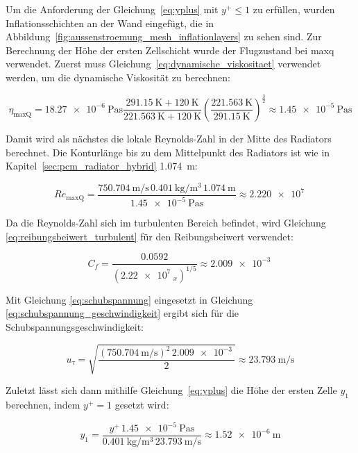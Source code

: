 Um die Anforderung der Gleichung~\ref{eq:yplus} mit $y^+ \leq 1$ zu erfüllen, wurden Inflationsschichten an der Wand eingefügt, die in Abbildung~\ref{fig:aussenstroemung_mesh_inflationlayers}
zu sehen sind. Zur Berechnung der Höhe der ersten Zellschicht wurde der Flugzustand bei \ac{maxq} verwendet.
Zuerst muss Gleichung~\ref{eq:dynamische_viskositaet} verwendet werden, um die dynamische Viskosität zu berechnen:

\begin{equation*}
  \eta_\mathrm{max Q} = \SI{18,27e-6}{\pascal\second} \frac{\SI{291,15}{\kelvin} + \SI{120}{\kelvin}}{\SI{221,563}{\kelvin} + \SI{120}{\kelvin}} {\left( \frac{\SI{221,563}{\kelvin}}{\SI{291,15}{\kelvin}} \right)}^{\frac{3}{2}} \approx \SI{1,45e-5}{\pascal\second}
\end{equation*}

Damit wird als nächstes die lokale Reynolds-Zahl in der Mitte des Radiators berechnet. Die Konturlänge bis zu dem Mittelpunkt des Radiators ist wie in Kapitel~\ref{sec:pcm_radiator_hybrid} \SI{1,074}{\meter}:

\begin{equation*}
  Re_{\mathrm{maxQ}} = \frac{\SI{750,704}{\meter\per\second}\,\SI{0,401}{\kilogram\per\meter\cubed}\,\SI{1,074}{\meter}}{\SI{1,45e-5}{\pascal\second}} \approx \SI{2,220e7}{}
\end{equation*}

Da die Reynolds-Zahl sich im turbulenten Bereich befindet, wird Gleichung \ref{eq:reibungsbeiwert_turbulent} für den Reibungsbeiwert verwendet:

\begin{equation*}
  C_f = \frac{0.0592}{\left({\SI{2,22e7}{}}_x\right)^{1/5}} \approx \SI{2,009e-3}{}
\end{equation*}

Mit Gleichung \ref{eq:schubspannung} eingesetzt in Gleichung \ref{eq:schubspannung_geschwindigkeit} ergibt sich für die Schubspannungsgeschwindigkeit:

\begin{equation*}
  u_{\tau} = \sqrt{\frac{\left(\SI{750,704}{\meter\per\second}\right)^2\,\SI{2,009e-3}{}}{2}} \approx \SI{23,793}{\meter\per\second}
\end{equation*}

\newpage

Zuletzt lässt sich dann mithilfe Gleichung~\ref{eq:yplus} die Höhe der ersten Zelle $y_1$ berechnen, indem $y^+ = 1$ gesetzt wird:

\begin{equation*}
  y_1 = \frac{y^+\,\SI{1,45e-5}{\pascal\second}}{\SI{0,401}{\kilogram\per\meter\cubed}\,\SI{23,793}{\meter\per\second}} \approx \SI{1,52e-6}{\meter}
\end{equation*}

